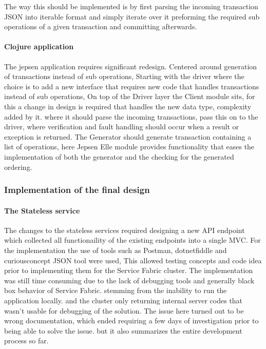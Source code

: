 \documentclass[a4paper,10pt,titlepage]{report}
\begin{document}
The way this should be implemented is by first parsing the incoming transaction JSON into iterable format and simply iterate over it preforming the required sub operations of a given transaction and committing afterwards.

\paragraph*{Clojure application}

The jepsen application requires significant redesign. Centered around generation of transactions instead of sub operations, Starting with the driver where the choice is to add a new interface that requires new code that handles transactions instead of sub operations, On top of the Driver layer the Client module sits, for this a change in design is required that handles the new data type, complexity added by it. where it should parse the incoming transactions, pass this on to the driver, where verification and fault handling should occur when a result or exception is returned. The Generator should generate transaction containing a list of operations, here Jepsen Elle module provides functionality that eases the implementation of both the generator and the checking for the generated ordering.

\subsubsection{Implementation of the final design}

\paragraph*{The Stateless service}

The changes to the stateless services required designing a new API endpoint which collected all functionaility of the existing endpoints into a single MVC. For the implementation the use of tools such as Postman, dotnetfiddle and curiousconcept JSON tool were used, This allowed testing concepts and code idea prior to implementing them for the Service Fabric cluster. The implementation was still time consuming due to the lack of debugging tools and generally black box behavior of Service Fabric. stemming from the inability  to run the application locally. and the cluster only returning internal server codes that wasn't usable for debugging of the solution. The issue here turned out to be wrong documentation, which ended requiring a few days of investigation prior to being able to solve the issue. but it also summarizes the entire development process so far.\\ 
\end{document}
